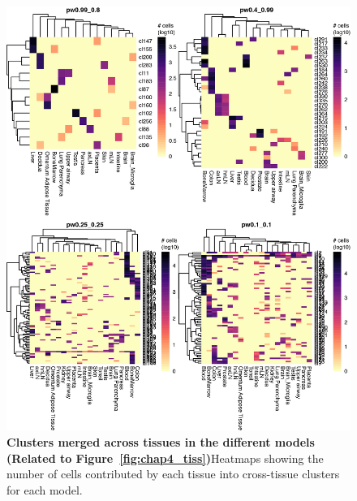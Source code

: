 \begin{figure}[ht!] 
\centering
\includegraphics[width=1.0\textwidth]{Appendix2/Figs/appB_tissue_clustrelations_HumanAtlas.png} %
\caption[Clusters merged across tissues in the different models]{\textbf{Clusters merged across tissues in the different models (Related to Figure~\ref{fig:chap4_tiss})}\newline Heatmaps showing the number of cells contributed by each tissue into cross-tissue clusters for each model.}
\label{fig:appB_tissrel}
\end{figure}


